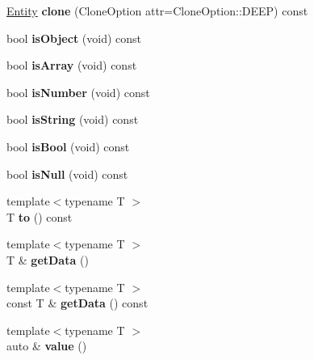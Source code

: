 \begin{DoxyCompactItemize}
\hyperlink{classzany_1_1_entity}{Entity} {\bfseries clone} (Clone\+Option attr=Clone\+Option\+::\+D\+E\+EP) const
\item 
\mbox{\label{classzany_1_1_entity_ae573986490449ae0513bd3e0e640ca50}} 
bool {\bfseries is\+Object} (void) const
\item 
\mbox{\label{classzany_1_1_entity_ae6908971cb9ef360026b441164bc6fae}} 
bool {\bfseries is\+Array} (void) const
\item 
\mbox{\label{classzany_1_1_entity_a4b2332f5a4e45849118e20e312c957ef}} 
bool {\bfseries is\+Number} (void) const
\item 
\mbox{\label{classzany_1_1_entity_af2567149bcbc8d2a8b5b96d78720c243}} 
bool {\bfseries is\+String} (void) const
\item 
\mbox{\label{classzany_1_1_entity_a4823951c80f2939c28a19344bf0a6ef5}} 
bool {\bfseries is\+Bool} (void) const
\item 
\mbox{\label{classzany_1_1_entity_ae249c0ff1d495ba051551e0247f7e599}} 
bool {\bfseries is\+Null} (void) const
\item 
\mbox{\label{classzany_1_1_entity_a5680d7d3126442c3f82a9045f4648e9c}} 
{\footnotesize template$<$typename T $>$ }\\T {\bfseries to} () const
\item 
\mbox{\label{classzany_1_1_entity_a36eaf259b330065ef5d4d562b485895a}} 
{\footnotesize template$<$typename T $>$ }\\T \& {\bfseries get\+Data} ()
\item 
\mbox{\label{classzany_1_1_entity_aa9836cb17e3e7747ab2146025d6f58ea}} 
{\footnotesize template$<$typename T $>$ }\\const T \& {\bfseries get\+Data} () const
\item 
\mbox{\label{classzany_1_1_entity_ab26474b9955424dedab37f6757065f4a}} 
{\footnotesize template$<$typename T $>$ }\\auto \& {\bfseries value} ()

\end{DoxyCompactItemize}
